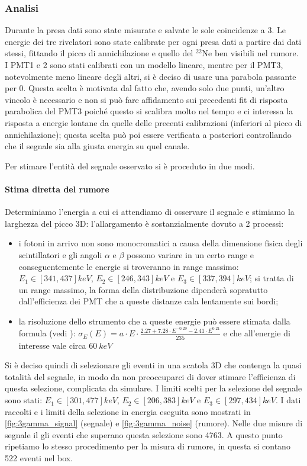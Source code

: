 \subsubsection{Analisi}
Durante la presa dati sono state misurate e salvate le sole coincidenze a 3. Le energie dei tre rivelatori sono state calibrate per ogni presa dati a partire dai dati stessi, fittando il picco di annichilazione e quello del $^{22}\text{Ne}$ ben visibili nel rumore. I PMT1 e 2 sono stati calibrati con un modello lineare, mentre per il PMT3, notevolmente meno lineare degli altri, si è deciso di usare una parabola passante per 0. Questa scelta è motivata dal fatto che, avendo solo due punti, un'altro vincolo è necessario e non si può fare affidamento sui precedenti fit di risposta parabolica del PMT3 poiché questo si scalibra molto nel tempo e ci interessa la risposta a energie lontane da quelle delle precenti calibrazioni (inferiori al picco di annichilazione); questa scelta può poi essere verificata a posteriori controllando che il segnale sia alla giusta energia su quel canale.

Per stimare l'entità del segnale osservato si è proceduto in due modi.
\paragraph{Stima diretta del rumore}
Determiniamo l'energia a cui ci attendiamo di osservare il segnale e stimiamo la larghezza del picco 3D: l'allargamento è sostanzialmente dovuto a 2 processi:
\begin{itemize}
	\item i fotoni in arrivo non sono monocromatici a causa della dimensione fisica degli scintillatori e gli angoli $\alpha$ e $\beta$ possono variare in un certo range e conseguentemente le energie si troveranno in range massimo:  $E_1 \in [341,437]\si{keV}$, $E_2 \in [246,343]\si{keV}$ e $E_3 \in [337,394]\si{keV}$; si tratta di un range massimo, la forma della distribuzione dipenderà sopratutto dall'efficienza dei PMT che a queste distanze cala lentamente sui bordi;
	\item la risoluzione dello strumento che a queste energie può essere stimata dalla formula (vedi \cite{6}):
	$\sigma_E(E) = a \cdot E \cdot \frac{2.27 + 7.28 \cdot E ^ {-0.29} - 2.41 \cdot E ^ {0.21}} {235}$ e che all'energie di interesse vale circa $\SI{60}{keV}$
\end{itemize}
Si è deciso quindi di selezionare gli eventi in una scatola 3D che contenga la quasi totalità del segnale, in modo da non preoccuparci di dover stimare l'efficienza di questa selezione, complicata da simulare. 
I limiti scelti per la selezione del segnale sono stati: $E_1 \in [301,477]\si{keV}$, $E_2 \in [206,383]\si{keV}$ e $E_3 \in [297,434]\si{keV}$.
I dati raccolti e i limiti della selezione in energia eseguita sono mostrati in \autoref{fig:3gamma_signal} (segnale) e \autoref{fig:3gamma_noise} (rumore).
Nelle due misure di segnale il gli eventi che superano questa selezione sono 4763. 
A questo punto ripetiamo lo stesso procedimento per la misura di rumore, in questa si contano 522 eventi nel box.

